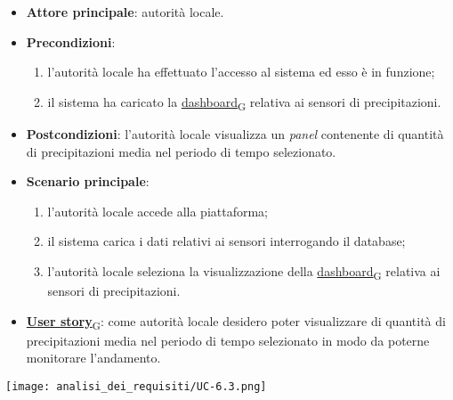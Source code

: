 \begin{itemize}
	\item \textbf{Attore principale}: autorità locale.
	\item \textbf{Precondizioni}:
	      \begin{enumerate}
		      \item l'autorità locale ha effettuato l'accesso al sistema ed esso è in funzione;
		      \item il sistema ha caricato la \href{https://7last.github.io/docs/rtb/documentazione-interna/glossario\#dashboard}{dashboard\textsubscript{G}} relativa ai sensori di precipitazioni.
	      \end{enumerate}
	\item \textbf{Postcondizioni}: l'autorità locale visualizza un \textit{panel} contenente di quantità di precipitazioni media nel periodo di tempo selezionato.
	\item \textbf{Scenario principale}:
	      \begin{enumerate}
		      \item l'autorità locale accede alla piattaforma;
		      \item il sistema carica i dati relativi ai sensori interrogando il database;
		      \item l'autorità locale seleziona la visualizzazione della \href{https://7last.github.io/docs/rtb/documentazione-interna/glossario\#dashboard}{dashboard\textsubscript{G}} relativa ai sensori di precipitazioni.
	      \end{enumerate}
	\item \href{https://7last.github.io/docs/rtb/documentazione-interna/glossario\#user-story}{\textbf{User story}\textsubscript{G}}: come autorità locale desidero poter visualizzare di quantità di precipitazioni media nel periodo di tempo selezionato
	      in modo da poterne monitorare l'andamento.
\end{itemize}
\begin{center}
	\texttt{[image: analisi\_dei\_requisiti/UC-6.3.png]}
\end{center}

\newpage

